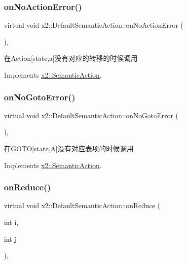 \subsubsection{\texorpdfstring{on\+No\+Action\+Error()}{onNoActionError()}}
{\footnotesize\ttfamily virtual void x2\+::\+Default\+Semantic\+Action\+::on\+No\+Action\+Error (\begin{DoxyParamCaption}{ }\end{DoxyParamCaption})\hspace{0.3cm}{\ttfamily [inline]}, {\ttfamily [virtual]}}

在\+Action\mbox{[}state,a\mbox{]}没有对应的转移的时候调用 

Implements \hyperlink{classx2_1_1_semantic_action_ac8afb7342d18d7d633c234047b16fe27}{x2\+::\+Semantic\+Action}.

\mbox{\label{classx2_1_1_default_semantic_action_acbd05d5f08396b9df966494bd4422a54}} 
\subsubsection{\texorpdfstring{on\+No\+Goto\+Error()}{onNoGotoError()}}
{\footnotesize\ttfamily virtual void x2\+::\+Default\+Semantic\+Action\+::on\+No\+Goto\+Error (\begin{DoxyParamCaption}{ }\end{DoxyParamCaption})\hspace{0.3cm}{\ttfamily [inline]}, {\ttfamily [virtual]}}

在\+G\+O\+TO\mbox{[}state,A\mbox{]}没有对应表项的时候调用 

Implements \hyperlink{classx2_1_1_semantic_action_a00d94c579c5962c74ccd5ee6bc9ef70c}{x2\+::\+Semantic\+Action}.

\mbox{\label{classx2_1_1_default_semantic_action_a25f6cc0ccc04c61ad57bfcf10b9c0cb9}} 
\subsubsection{\texorpdfstring{on\+Reduce()}{onReduce()}}
{\footnotesize\ttfamily virtual void x2\+::\+Default\+Semantic\+Action\+::on\+Reduce (\begin{DoxyParamCaption}\item[{int}]{i,  }\item[{int}]{j }\end{DoxyParamCaption})\hspace{0.3cm}{\ttfamily [inline]}, {\ttfamily [virtual]}}

